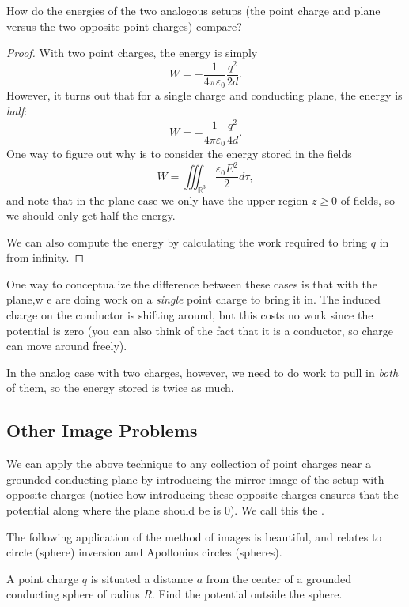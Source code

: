 \begin{example}
How do the energies of the two analogous setups (the point charge and plane versus the two opposite point charges) compare?
\end{example}

\begin{proof}
With two point charges, the energy is simply
\[W=-\frac{1}{4\pi\varepsilon_0}\frac{q^2}{2d}.\]
However, it turns out that for a single charge and conducting plane, the energy is \textit{half}:
\[W=-\frac{1}{4\pi\varepsilon_0}\frac{q^2}{4d}.\]
One way to figure out why is to consider the energy stored in the fields
\[W=\iiint_{\mathbb{R}^3}\frac{\varepsilon_0E^2}{2}d\tau,\]
and note that in the plane case we only have the upper region $z\ge 0$ of fields, so we should only get half the energy.

We can also compute the energy by calculating the work required to bring $q$ in from infinity.
\end{proof}

\begin{remark}
One way to conceptualize the difference between these cases is that with the plane,w e are doing work on a \textit{single} point charge to bring it in. The induced charge on the conductor is shifting around, but this costs no work since the potential is zero (you can also think of the fact that it is a conductor, so charge can move around freely).

In the analog case with two charges, however, we need to do work to pull in \textit{both} of them, so the energy stored is twice as much.
\end{remark}

\subsection{Other Image Problems}

We can apply the above technique to any collection of point charges near a grounded conducting plane by introducing the mirror image of the setup with opposite charges (notice how introducing these opposite charges ensures that the potential along where the plane should be is 0). We call this the .

The following application of the method of images is beautiful, and relates to circle (sphere) inversion and Apollonius circles (spheres).

\begin{example}
A point charge $q$ is situated a distance $a$ from the center of a grounded conducting sphere of radius $R$. Find the potential outside the sphere.
\end{example}

